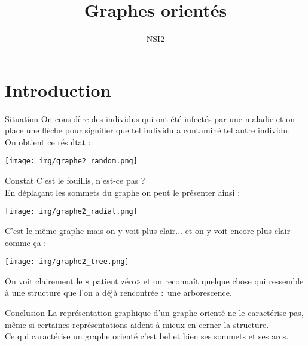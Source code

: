 \documentclass[10pt]{beamer}
\title{Graphes orientés}
\author{NSI2}
\begin{document}
\maketitle

\section{Introduction}

\begin{frame}{Situation}
On considère des individus qui ont été infectés par une maladie et on place une flèche pour signifier que tel individu a contaminé tel autre individu.\\
On obtient ce résultat :
\end{frame}
\begin{frame}{}
\begin{center}
\texttt{[image: img/graphe2\_random.png]}
\end{center}
\end{frame}
\begin{frame}{Constat}
C'est le fouillis, n'est-ce pas ? \\

En déplaçant les sommets du graphe on peut le présenter ainsi :
\end{frame}
\begin{frame}{}
\begin{center}
\texttt{[image: img/graphe2\_radial.png]}
\end{center}
\end{frame}
\begin{frame}{}
C'est le même graphe mais on y voit plus clair... et on y voit encore plus clair comme ça :
\end{frame}
\begin{frame}{}
\begin{center}
\texttt{[image: img/graphe2\_tree.png]}
\end{center}
On voit clairement le « patient zéro» et on reconnaît quelque chose qui ressemble à une structure que l'on a déjà rencontrée :\pause \ une arborescence.
\end{frame}
\begin{frame}{Conclusion}
La représentation graphique d'un graphe orienté ne le caractérise pas, même si certaines représentations aident à mieux en cerner la structure.\\

Ce qui caractérise un graphe orienté c'est bel et bien ses \alert{sommets} et ses \alert{arcs}.
\end{frame}
\end{document}
